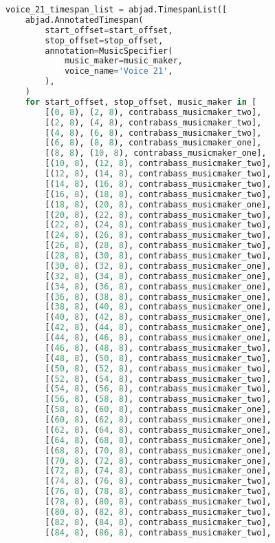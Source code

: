 \begin{lstlisting}[language=Python, caption=Invocation Source Code]
voice_21_timespan_list = abjad.TimespanList([
    abjad.AnnotatedTimespan(
        start_offset=start_offset,
        stop_offset=stop_offset,
        annotation=MusicSpecifier(
            music_maker=music_maker,
            voice_name='Voice 21',
        ),
    )
    for start_offset, stop_offset, music_maker in [
        [(0, 8), (2, 8), contrabass_musicmaker_two],
        [(2, 8), (4, 8), contrabass_musicmaker_two],
        [(4, 8), (6, 8), contrabass_musicmaker_two],
        [(6, 8), (8, 8), contrabass_musicmaker_one],
        [(8, 8), (10, 8), contrabass_musicmaker_one],
        [(10, 8), (12, 8), contrabass_musicmaker_two],
        [(12, 8), (14, 8), contrabass_musicmaker_two],
        [(14, 8), (16, 8), contrabass_musicmaker_two],
        [(16, 8), (18, 8), contrabass_musicmaker_two],
        [(18, 8), (20, 8), contrabass_musicmaker_one],
        [(20, 8), (22, 8), contrabass_musicmaker_two],
        [(22, 8), (24, 8), contrabass_musicmaker_two],
        [(24, 8), (26, 8), contrabass_musicmaker_two],
        [(26, 8), (28, 8), contrabass_musicmaker_two],
        [(28, 8), (30, 8), contrabass_musicmaker_two],
        [(30, 8), (32, 8), contrabass_musicmaker_one],
        [(32, 8), (34, 8), contrabass_musicmaker_one],
        [(34, 8), (36, 8), contrabass_musicmaker_one],
        [(36, 8), (38, 8), contrabass_musicmaker_one],
        [(38, 8), (40, 8), contrabass_musicmaker_one],
        [(40, 8), (42, 8), contrabass_musicmaker_one],
        [(42, 8), (44, 8), contrabass_musicmaker_one],
        [(44, 8), (46, 8), contrabass_musicmaker_one],
        [(46, 8), (48, 8), contrabass_musicmaker_two],
        [(48, 8), (50, 8), contrabass_musicmaker_two],
        [(50, 8), (52, 8), contrabass_musicmaker_two],
        [(52, 8), (54, 8), contrabass_musicmaker_two],
        [(54, 8), (56, 8), contrabass_musicmaker_two],
        [(56, 8), (58, 8), contrabass_musicmaker_two],
        [(58, 8), (60, 8), contrabass_musicmaker_one],
        [(60, 8), (62, 8), contrabass_musicmaker_one],
        [(62, 8), (64, 8), contrabass_musicmaker_one],
        [(64, 8), (68, 8), contrabass_musicmaker_one],
        [(68, 8), (70, 8), contrabass_musicmaker_one],
        [(70, 8), (72, 8), contrabass_musicmaker_one],
        [(72, 8), (74, 8), contrabass_musicmaker_one],
        [(74, 8), (76, 8), contrabass_musicmaker_two],
        [(76, 8), (78, 8), contrabass_musicmaker_two],
        [(78, 8), (80, 8), contrabass_musicmaker_two],
        [(80, 8), (82, 8), contrabass_musicmaker_two],
        [(82, 8), (84, 8), contrabass_musicmaker_two],
        [(84, 8), (86, 8), contrabass_musicmaker_two],

\end{lstlisting}
